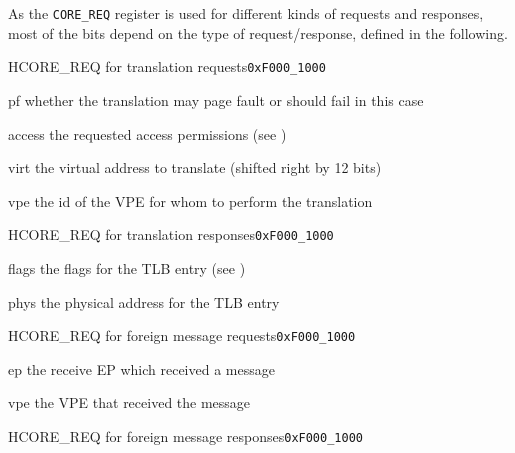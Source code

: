 \noindent As the \texttt{CORE\_REQ} register is used for different kinds of requests and responses,
most of the bits depend on the type of request/response, defined in the following.

\begin{register}{H}{CORE\_REQ for translation requests}{\texttt{0xF000\_1000}}
  \regnewline%
  \begin{regdesc}\begin{reglist}
    \item[pf] whether the translation may page fault or should fail in this case
    \item[access] the requested access permissions (see )
    \item[virt] the virtual address to translate (shifted right by 12 bits)
    \item[vpe] the id of the VPE for whom to perform the translation
  \end{reglist}\end{regdesc}
\end{register}

\begin{register}{H}{CORE\_REQ for translation responses}{\texttt{0xF000\_1000}}
  \regnewline%
  \begin{regdesc}\begin{reglist}
    \item[flags] the flags for the TLB entry (see )
    \item[phys] the physical address for the TLB entry
  \end{reglist}\end{regdesc}
\end{register}
\extend{}

\begin{register}{H}{CORE\_REQ for foreign message requests}{\texttt{0xF000\_1000}}
  \regnewline%
  \begin{regdesc}\begin{reglist}
    \item[ep] the receive EP which received a message
    \item[vpe] the VPE that received the message
  \end{reglist}\end{regdesc}
\end{register}

\begin{register}{H}{CORE\_REQ for foreign message responses}{\texttt{0xF000\_1000}}
  \regnewline%
\end{register}

